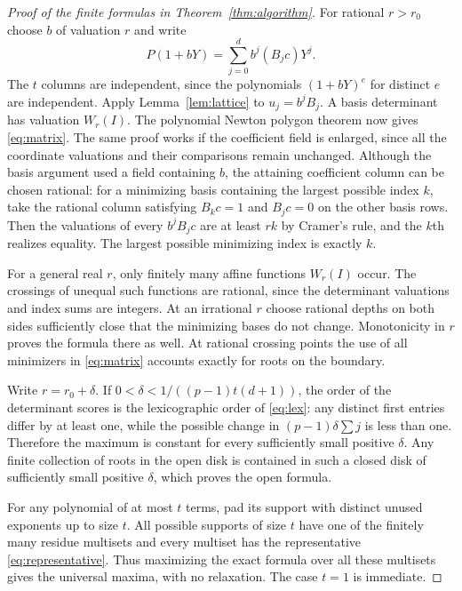 \documentclass[11pt]{article}
\theoremstyle{remark}\newtheorem{remark}[theorem]{Remark}
\begin{document}
\begin{proof}[Proof of the finite formulas in Theorem~\ref{thm:algorithm}]
For rational $r>r_0$ choose $b$ of valuation $r$ and write
\[
 P(1+bY)=\sum_{j=0}^d b^j(B_j c)Y^j.
\]
The $t$ columns are independent, since the polynomials $(1+bY)^e$ for distinct $e$
are independent. Apply Lemma~\ref{lem:lattice} to $u_j=b^j B_j$. A basis determinant
has valuation $W_r(I)$. The polynomial Newton polygon theorem now gives
\eqref{eq:matrix}. The same proof works if the coefficient field is enlarged, since
all the coordinate valuations and their comparisons remain unchanged. Although the
basis argument used a field containing $b$, the attaining coefficient column can be
chosen rational: for a minimizing basis containing the largest possible index $k$,
take the rational column satisfying $B_kc=1$ and $B_jc=0$ on the other basis rows.
Then the valuations of every $b^j B_jc$ are at least $rk$ by Cramer's rule, and the
$k$th realizes equality. The largest possible minimizing index is exactly $k$.

For a general real $r$, only finitely many affine functions $W_r(I)$ occur. The
crossings of unequal such functions are rational, since the determinant valuations
and index sums are integers. At an irrational $r$ choose rational depths on both
sides sufficiently close that the minimizing bases do not change. Monotonicity in
$r$ proves the formula there as well. At rational crossing points the use of all
minimizers in \eqref{eq:matrix} accounts exactly for roots on the boundary.

Write $r=r_0+\delta$. If $0<\delta<1/((p-1)t(d+1))$, the order of the determinant
scores is the lexicographic order of \eqref{eq:lex}: any distinct first entries differ
by at least one, while the possible change in $(p-1)\delta\sum j$ is less than one.
Therefore the maximum is constant for every sufficiently small positive $\delta$.
Any finite collection of roots in the open disk is contained in such a closed disk
of sufficiently small positive $\delta$, which proves the open formula.

For any polynomial of at most $t$ terms, pad its support with distinct unused
exponents up to size $t$. All possible supports of size $t$ have one of the finitely
many residue multisets and every multiset has the representative \eqref{eq:representative}.
Thus maximizing the exact formula over all these multisets gives the universal
maxima, with no relaxation. The case $t=1$ is immediate.
\end{proof}
\end{document}
